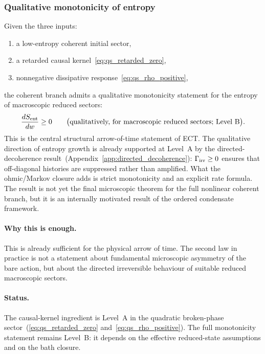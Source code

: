 \documentclass[11pt,a4paper]{article}
\numberwithin{equation}{section}
\begin{document}
\subsubsection*{Qualitative monotonicity of entropy}

Given the three inputs:
\begin{enumerate}[label=(\roman*)]
  \item a low-entropy coherent initial sector,
  \item a retarded causal kernel~\eqref{eq:qs_retarded_zero},
  \item nonnegative dissipative response~\eqref{eq:qs_rho_positive},
\end{enumerate}
the coherent branch admits a qualitative monotonicity statement for the
entropy of macroscopic reduced sectors:
\begin{equation}
  \label{eq:qs_entropy_monotone}
  \frac{dS_{\rm ent}}{dw} \ge 0
  \qquad
  \bigl(\text{qualitatively, for macroscopic reduced sectors;
  Level~B}\bigr).
\end{equation}
This is the central structural arrow-of-time statement of ECT.
The qualitative direction of entropy growth is already supported at
Level~A by the directed-decoherence
result~(Appendix~\ref{app:directed_decoherence}):
$\Gamma_{\rm irr}\geq 0$ ensures that off-diagonal histories are
suppressed rather than amplified.
What the ohmic/Markov closure adds is strict monotonicity and an
explicit rate formula.
The result is not yet the final microscopic theorem for the full
nonlinear coherent branch, but it is an internally motivated result of
the ordered condensate framework.

\paragraph{Why this is enough.}
This is already sufficient for the physical arrow of time.
The second law in practice is not a statement about fundamental
microscopic asymmetry of the bare action, but about the directed
irreversible behaviour of suitable reduced macroscopic sectors.

\paragraph{Status.}
The causal-kernel ingredient is Level~A in the quadratic broken-phase
sector~(\eqref{eq:qs_retarded_zero} and~\eqref{eq:qs_rho_positive}).
The full monotonicity statement remains Level~B: it depends on the
effective reduced-state assumptions and on the bath closure.
\end{document}
